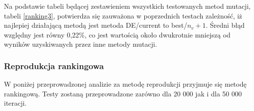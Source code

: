 \begin{itemize}
Na podstawie tabeli będącej zestawieniem wszystkich testowanych metod mutacji, tabeli \ref{ranking3}, potwierdza się zauważona w poprzednich testach zależność, iż najlepiej działającą metodą jest metoda DE/current to best/$n_{v}+1$. Średni błąd względny jest równy 0,22\%, co jest wartością około dwukrotnie mniejszą od wyników uzyskiwanych przez inne metody mutacji.

\end{itemize}



\subsubsection{Reprodukcja rankingowa}
W poniżej przeprowadzonej analizie za metodę reprodukcji przyjmuje się metodę rankingową. Testy zostaną przeprowadzone zarówno dla 20 000 jak i dla 50 000 iteracji.\\
\par

